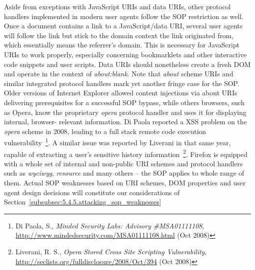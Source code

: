 	Aside from exceptions with JavaScript URIs and data URIs, other protocol handlers implemented in modern user agents follow the SOP restriction as well. Once a document contains a link to a JavaScript/data URI, several user agents will follow the link but stick to the domain context the link originated from, which essentially means the referrer's domain. This is necessary for JavaScript URIs to work properly, especially concerning bookmarklets and other interactive code snippets and user scripts. Data URIs should nonetheless create a fresh DOM and operate in the context of \textit{about:blank}. Note that \textit{about} scheme URIs and similar integrated protocol handlers mark yet another fringe case for the SOP. Older versions of Internet Explorer allowed content injections via about URIs delivering prerequisites for a successful SOP bypass, while others browsers, such as Opera, know the proprietary \textit{opera} protocol handler and uses it for displaying internal, browser- relevant information. Di Paola 
reported a XSS problem on the \textit{opera} scheme in 2008, leading to a full stack remote code execution vulnerability~\footnote{Di Paola, S., \textit{Minded Security Labs: Advisory \#MSA01111108}, \url{http://www.mindedsecurity.com/MSA01111108.html} (Oct 2008)}. A similar issue was reported by Liverani in that same year, capable of extracting a user's sensitive history information~\footnote{Liverani, R. S., \textit{Opera Stored Cross Site Scripting Vulnerability}, \url{http://seclists.org/fulldisclosure/2008/Oct/394} (Oct 2008)}. Firefox is equipped with a whole set of internal and non-public URI schemes and protocol handlers such as \textit{wyciwyg}, \textit{resource} and many others -- the SOP applies to whole range of them. Actual SOP weaknesses based on URI schemes, DOM properties and user agent design decisions will constitute our considerations of Section~\ref{subsubsec:5.4.5.attacking_sop_weaknesses}\\

